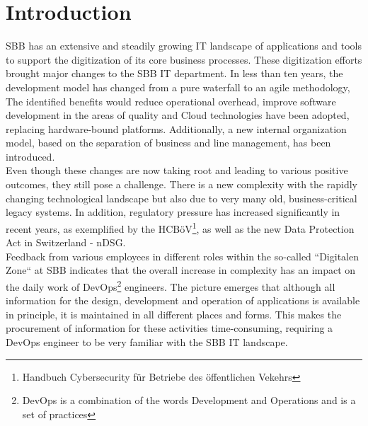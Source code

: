 \documentclass[a4paper,10pt]{article}
\begin{document}
    \pagebreak



    \section{Introduction}
    \label{sec:introduction}
    SBB has an extensive and steadily growing IT landscape of applications and tools to support the digitization of its
    core business processes.
    These digitization efforts brought major changes to the SBB IT department.
    In less than ten years, the development model has changed from a pure waterfall to an agile methodology,
    The identified benefits would reduce operational overhead, improve software development in the areas of quality and
    Cloud technologies have been adopted, replacing hardware-bound platforms.
    Additionally, a new internal organization model, based on the separation of business and line management, has been introduced.\\
    Even though these changes are now taking root and leading to various positive outcomes, they still pose a challenge.
    There is a new complexity with the rapidly changing technological landscape but also due to very many old,
    business-critical legacy systems.
    In addition, regulatory pressure has increased significantly in recent years, as exemplified by the
    HCBöV\footnote{Handbuch Cybersecurity für Betriebe des öffentlichen Vekehrs}, as well as the new Data Protection Act in Switzerland - nDSG.\\
    Feedback from various employees in different roles within the so-called ``Digitalen Zone`` at SBB indicates that the overall
    increase in complexity has an impact on the daily work of DevOps\footnote{DevOps is a combination of the words
    Development and Operations and is a set of practices} engineers.
    The picture emerges that although all information for the design, development and operation of
    applications is available in principle, it is maintained in all different places and forms.
    This makes the procurement of information for these activities time-consuming, requiring a DevOps engineer to be very
    familiar with the SBB IT landscape.
\end{document}
